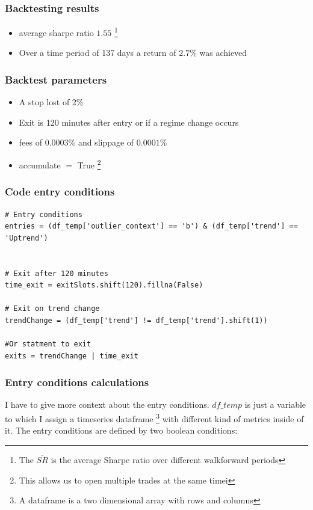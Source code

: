 \documentclass[12pt]{article}
\begin{document}
\subsubsection*{Backtesting results}

\begin{itemize}
    \item average sharpe ratio $1.55$ \footnote{The $\overline{SR}$ is the average Sharpe ratio over different walkforward periods}
    \item Over a time period of 137 days a return of $2.7\%$ was achieved
\end{itemize}


\subsubsection*{Backtest parameters}

\begin{itemize}
    \item A stop lost of $2\%$
    \item Exit is 120 minutes after entry or if a regime change occurs
    \item fees of $0.0003\%$ and slippage of $0.0001\%$
    \item accumulate $=$ True \footnote{This allows us to open multiple trades at the same timei}
\end{itemize}


\subsubsection*{Code entry conditions}

\begin{verbatim}
# Entry conditions
entries = (df_temp['outlier_context'] == 'b') & (df_temp['trend'] == 'Uptrend')


# Exit after 120 minutes
time_exit = exitSlots.shift(120).fillna(False)

# Exit on trend change
trendChange = (df_temp['trend'] != df_temp['trend'].shift(1))

#Or statment to exit
exits = trendChange | time_exit
\end{verbatim}




\newpage
\subsubsection*{Entry conditions calculations}
I have to give more context about the entry conditions. $df\_temp$ is just a variable to which I assign a timeseries dataframe \footnote{A dataframe is a two dimensional array with rows and columns} with different kind of metrics inside of it. The entry conditions are defined by two boolean conditions:
\end{document}
